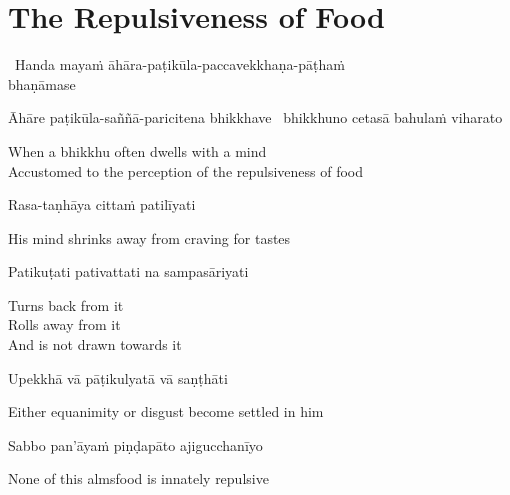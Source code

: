 \suttaRef{[MN 2]}




\section{The Repulsiveness of Food}
\label{repulsiveness-of-food}

\begin{leader}
  \anglebracketleft\ \hspace{-0.5mm}Handa mayaṁ āhāra-paṭikūla-paccavekkhaṇa-pāṭhaṁ\\ bhaṇāmase \hspace{-0.5mm}\anglebracketright\
\end{leader}

\begin{pali-hang}
  Āhāre paṭikūla-saññā-paricitena bhikkhave \breathmark\ bhikkhuno cetasā bahulaṁ viharato
\end{pali-hang}

\begin{english}
  When a bhikkhu often dwells with a mind\\
  Accustomed to the perception of the repulsiveness of food
\end{english}

Rasa-taṇhāya cittaṁ patilīyati

\begin{english}
  His mind shrinks away from craving for tastes
\end{english}

Patikuṭati pativattati na sampasāriyati

\begin{english-verses}
  Turns back from it\\
  Rolls away from it\\
  And is not drawn towards it
\end{english-verses}

Upekkhā vā pāṭikulyatā vā saṇṭhāti

\begin{english}
  Either equanimity or disgust become settled in him
\end{english}

\suttaRef{[AN 7.49]}

Sabbo pan'āyaṁ piṇḍapāto ajigucchanīyo

\begin{english}
  None of this almsfood is innately repulsive
\end{english}

